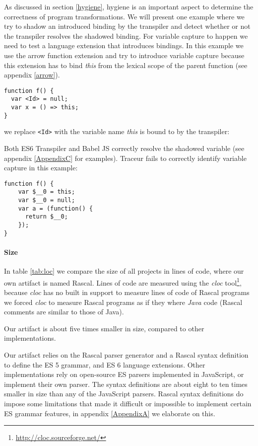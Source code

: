 As discussed in section \ref{hygiene}, hygiene is an important aspect to determine the correctness of program transformations. We will present one example where we try to shadow an introduced binding by the transpiler and detect whether or not the transpiler resolves the shadowed binding. For variable capture to happen we need to test a language extension that introduces bindings. In this example we use the arrow function extension and try to introduce variable capture because this extension has to bind \textit{this} from the lexical scope of the parent function (see appendix \ref{arrow}).

\begin{lstlisting}[label=traceur-capture, caption=Example input to Traceur\protect\footnotemark]
function f() {
  var <Id> = null;
  var x = () => this;
}
\end{lstlisting}

we replace \lstinline$<Id>$ with the variable name \textit{this} is bound to by the transpiler:

Both ES6 Transpiler and Babel JS correctly resolve the shadowed variable (see appendix \ref{AppendixC} for examples). Traceur fails to correctly identify variable capture in this example:

\begin{lstlisting}[caption=Variable capture in Traceur transpiler]
function f() {
    var $__0 = this;
    var $__0 = null;
    var a = (function() {
      return $__0;
	});
}
\end{lstlisting}


\paragraph{Size}
In table \ref{tab:loc} we compare the size of all projects in lines of code, where our own artifact is named Rascal. Lines of code are measured using the \textit{cloc} tool\footnote{\url{http://cloc.sourceforge.net/}}, because \textit{cloc} has no built in support to measure lines of code of Rascal programs we forced \textit{cloc} to measure Rascal programs as if they where \textit{Java} code (Rascal comments are similar to those of Java).

Our artifact is about five times smaller in size, compared to other implementations.

Our artifact relies on the Rascal parser generator and a Rascal syntax definition to define the ES 5 grammar, and ES 6 language extensions. Other implementations rely on open-source ES parsers implemented in JavaScript, or implement their own parser. The syntax definitions are about eight to ten times smaller in size than any of the JavaScript parsers. Rascal syntax definitions do impose some limitations that made it difficult or impossible to implement certain ES grammar features, in appendix \ref{AppendixA} we elaborate on this.

